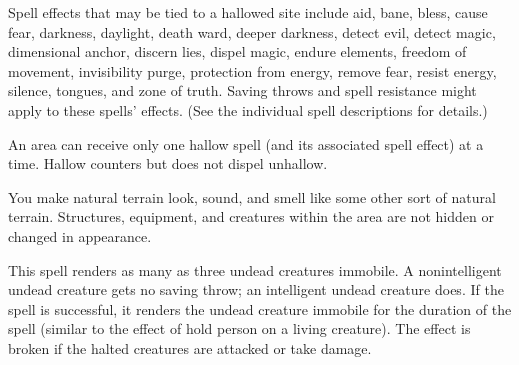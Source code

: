 \begin{multicols}{2}
\begin{small}
\smallskip\noindent Spell effects that may be tied to a hallowed site include aid, bane, bless, cause fear, darkness, daylight, death ward, deeper darkness, detect evil, detect magic, dimensional anchor, discern lies, dispel magic, endure elements, freedom of movement, invisibility purge, protection from energy, remove fear, resist energy, silence, tongues, and zone of truth. Saving throws and spell resistance might apply to these spells' effects. (See the individual spell descriptions for details.)

\smallskip\noindent An area can receive only one hallow spell (and its associated spell effect) at a time. Hallow counters but does not dispel unhallow.


\noindent You make natural terrain look, sound, and smell like some other sort of natural terrain. Structures, equipment, and creatures within the area are not hidden or changed in appearance.


\noindent This spell renders as many as three undead creatures immobile. A nonintelligent undead creature gets no saving throw; an intelligent undead creature does. If the spell is successful, it renders the undead creature immobile for the duration of the spell (similar to the effect of hold person on a living creature). The effect is broken if the halted creatures are attacked or take damage.


\end{small}
\end{multicols}
